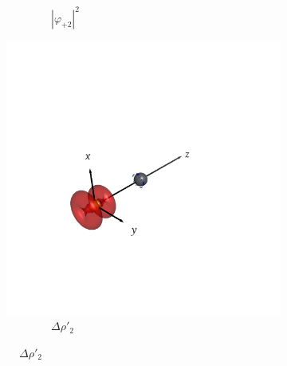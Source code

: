 \documentclass[journal=inoraj,manuscript=article]{achemso}
\begin{document}
\begin{figure}[!h]
\begin{subfigure}[t]{0.32\textwidth}
        \caption*{\ \ \ \ \ \ \ \ $|\varphi_{+2}|^2$}
    \end{subfigure}
    \hfill
    \begin{subfigure}[t]{0.32\textwidth}
        \centering
        \includegraphics[width=\linewidth]{./AuPb+/pair3.png} 
        \caption*{\ \ \ \ \ \ \ \ $\Delta \rho'_2$} 
    \end{subfigure}


\end{figure}
\end{document}
